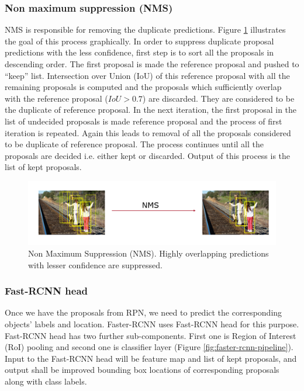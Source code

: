\subsubsection{Non maximum suppression (NMS)}
NMS is responsible for removing the duplicate predictions. Figure \ref{fig:nms} illustrates the goal of this process graphically. In order to suppress duplicate proposal predictions with the less confidence, first step is to sort all the proposals in descending order. The first proposal is made  the reference proposal and pushed to ``keep'' list. Intersection over Union (IoU) of this reference proposal with all the remaining proposals is computed and the proposals which sufficiently overlap with the reference proposal ($IoU > 0.7$) are discarded. They are considered to be the duplicate of reference proposal. In the next iteration, the first proposal in the list of undecided proposals is made reference proposal and the process of first iteration is repeated. Again this leads to removal of all the proposals considered to be duplicate of reference proposal. The process continues until all the proposals are decided i.e. either kept or discarded. Output of this process is the list of kept proposals. 

\begin{figure}
    \centering
    \includegraphics[width=\linewidth]{images/nms.PNG}
    \caption[Non Maximum Suppression (NMS)]{Non Maximum Suppression (NMS). Highly overlapping predictions with lesser confidence are suppressed.}
    \label{fig:nms}
\end{figure}

\subsubsection{Fast-RCNN head}
Once we have the proposals from RPN, we need to predict the corresponding objects' labels and location. Faster-RCNN uses Fast-RCNN head\cite{ref_fastrcnn} for this purpose. Fast-RCNN head has two further sub-components. First one is Region of Interest (RoI) pooling and second one is classifier layer (Figure \ref{fig:faster-rcnn-pipeline}). Input to the Fast-RCNN head will be feature map and list of kept proposals, and output shall be improved bounding box locations of corresponding proposals along with class labels. 

